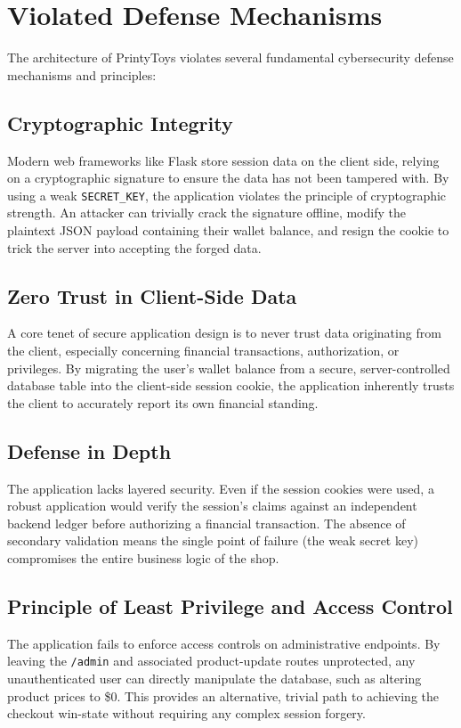 \documentclass[12pt,a4paper]{article}
\begin{document}
\section{Violated Defense Mechanisms}
The architecture of PrintyToys violates several fundamental cybersecurity defense mechanisms and principles:

\subsection{Cryptographic Integrity}
Modern web frameworks like Flask store session data on the client side, relying on a cryptographic signature to ensure the data has not been tampered with. By using a weak \texttt{SECRET\_KEY}, the application violates the principle of cryptographic strength. An attacker can trivially crack the signature offline, modify the plaintext JSON payload containing their wallet balance, and resign the cookie to trick the server into accepting the forged data.

\subsection{Zero Trust in Client-Side Data}
A core tenet of secure application design is to never trust data originating from the client, especially concerning financial transactions, authorization, or privileges. By migrating the user's wallet balance from a secure, server-controlled database table into the client-side session cookie, the application inherently trusts the client to accurately report its own financial standing. 

\subsection{Defense in Depth}
The application lacks layered security. Even if the session cookies were used, a robust application would verify the session's claims against an independent backend ledger before authorizing a financial transaction. The absence of secondary validation means the single point of failure (the weak secret key) compromises the entire business logic of the shop.

\subsection{Principle of Least Privilege and Access Control}
The application fails to enforce access controls on administrative endpoints. By leaving the \texttt{/admin} and associated product-update routes unprotected, any unauthenticated user can directly manipulate the database, such as altering product prices to \$0. This provides an alternative, trivial path to achieving the checkout win-state without requiring any complex session forgery.
\end{document}
